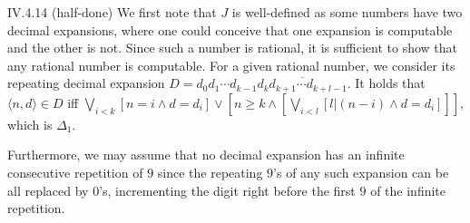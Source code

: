 \documentclass[12pt]{article}
\begin{document}
\begin{customthm}{IV.4.14} (half-done)
  We first note that $J$ is well-defined as some numbers have two decimal expansions, where one could conceive that one expansion is computable and the other is not. Since such a number is rational, it is sufficient to show that any rational number is computable. For a given rational number, we consider its repeating decimal expansion $D=d_0d_1\cdots d_{k-1}\overline{d_kd_{k+1}\cdots d_{k+l-1}}$. It holds that $\langle n,d\rangle\in D$ iff $\bigvee_{i<k}[n=i\wedge d=d_i]\vee[n\geq k\wedge[\bigvee_{i<l}[l|(n-i)\wedge d=d_i]]]$, which is $\Delta_1$.

  Furthermore, we may assume that no decimal expansion has an infinite consecutive repetition of $9$ since the repeating $9$'s of any such expansion can be all replaced by $0$'s, incrementing the digit right before the first $9$ of the infinite repetition.


\end{customthm}
\end{document}
